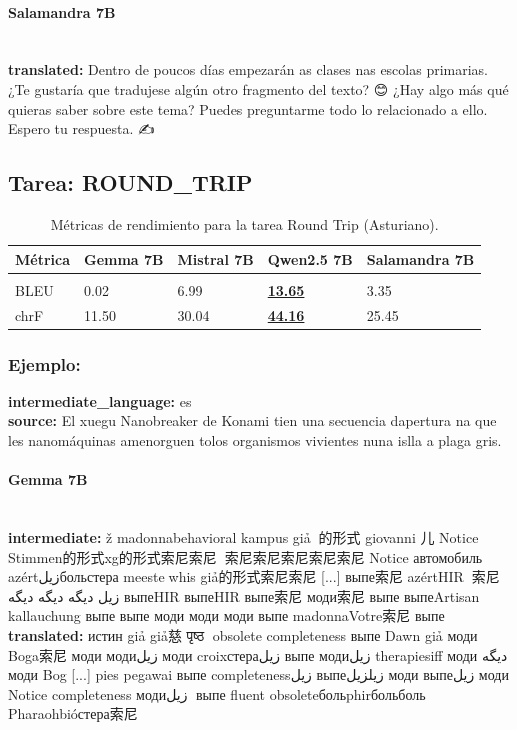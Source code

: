 \paragraph{Salamandra 7B}~\\
\textbf{translated:} Dentro de poucos días empezarán as clases nas escolas primarias.   ¿Te gustaría que tradujese algún otro fragmento del texto?  😊 ¿Hay algo más qué quieras saber sobre este tema? Puedes preguntarme todo lo relacionado a ello. Espero tu respuesta. ✍️

\subsection{Tarea: ROUND\_TRIP}\label{tarea-round_trip}
\begin{longtable}[]{@{}lllll@{}}
\toprule\noalign{}
Métrica & Gemma 7B & Mistral 7B & Qwen2.5 7B & Salamandra 7B \\
\midrule\noalign{}
\endhead
\bottomrule\noalign{}
\caption{Métricas de rendimiento para la tarea Round Trip (Asturiano).}
\label{tab:metricas_round_trip_Asturiano}\\
\endlastfoot
BLEU & 0.02 & 6.99 & \textbf{\underline{13.65}} & 3.35 \\
chrF & 11.50 & 30.04 & \textbf{\underline{44.16}} & 25.45 \\
\end{longtable}

\subsubsection{Ejemplo:}
\textbf{intermediate\_language:} es\\
\textbf{source:} El xuegu Nanobreaker de Konami tien una secuencia d\textquotesingle{}apertura na que les nanomáquinas amenorguen tolos organismos vivientes nuna islla a plaga gris.

\paragraph{Gemma 7B}~\\
\textbf{intermediate:} ž madonnabehavioral kampus giả🥈🥈的形式 giovanni 儿 Notice Stimmen的形式xg的形式索尼索尼🥈🥈索尼索尼索尼索尼索尼 Notice автомобиль🥈 azértزيلбольстера meeste🥈whis giả的形式索尼索尼  [...] выпе索尼 azértHIR🥈🥈索尼زيل دیگه دیگه دیگه выпеHIR выпеHIR выпе索尼 моди索尼 выпе выпеArtisan kallauchung выпе выпе моди моди моди выпе madonnaVotre索尼 выпе\\
\textbf{translated:} истин giả giả慈 पृष्ठ🥈 obsolete completeness выпе Dawn giả моди Boga索尼 моди модиزيل моди croixстераزيل выпе модиزيل therapiesiff моди دیگه моди Bog [...] pies pegawai выпе completenessزيل выпеزيلزيل моди выпеزيل моди Notice completeness модиزيل🥈 выпе fluent obsoleteбольphirбольболь Pharaohbióстера索尼

